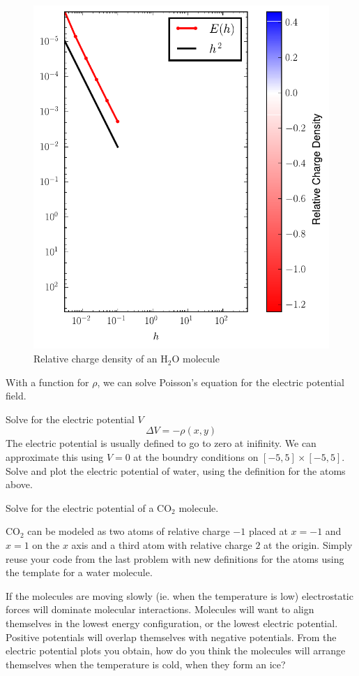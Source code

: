\begin{figure}
\includegraphics[width=\textwidth]{waterRho.pdf}
\caption{Relative charge density of an H$_2$O molecule}
\end{figure}

With a function for $\rho$, we can solve Poisson's equation for the electric potential field.
\begin{problem}
Solve for the electric potential $V$
\[\Delta V = -\rho(x,y)\]
The electric potential is usually defined to go to zero at inifinity.
We can approximate this using $V=0$ at the boundry conditions on $[-5,5]\times [-5,5]$.
Solve and plot the electric potential of water, using the definition for the atoms above.

\end{problem}

\begin{problem}
Solve for the electric potential of a CO$_2$ molecule.

CO$_2$ can be modeled as two atoms of relative charge $-1$ placed at $x=-1$ and $x=1$ on the $x$ axis and a third atom with relative charge $2$ at the origin.
Simply reuse your code from the last problem with new definitions for the atoms using the template for a water molecule.

If the molecules are moving slowly (ie. when the temperature is low) electrostatic forces will dominate molecular interactions.
Molecules will want to align themselves in the lowest energy configuration, or the lowest electric potential.
Positive potentials will overlap themselves with negative potentials.
From the electric potential plots you obtain, how do you think the molecules will arrange themselves when the temperature is cold, when they form an ice?
\end{problem}

